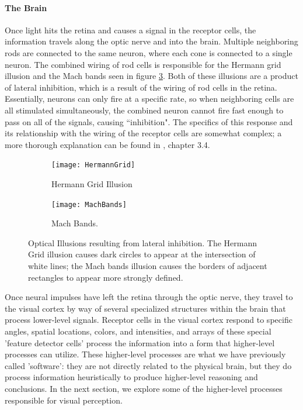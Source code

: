 \documentclass[11pt]{isuthesis}\usepackage[]{graphicx}\usepackage[]{color}
\begin{document}
\paragraph{The Brain}
Once light hits the retina and causes a signal in the receptor cells, the information travels along the optic nerve and into the brain. Multiple neighboring rods are connected to the same neuron, where each cone is connected to a single neuron. The combined wiring of rod cells is responsible for the Hermann grid illusion and the Mach bands seen in figure \ref{fig:InhibitionIllusions}. Both of these illusions are a product of lateral inhibition, which is a result of the wiring of rod cells in the retina. Essentially, neurons can only fire at a specific rate, so when neighboring cells are all stimulated simultaneously, the combined neuron cannot fire fast enough to pass on all of the signals, causing ``inhibition". The specifics of this response and its relationship with the wiring of the receptor cells are somewhat complex; a more thorough explanation can be found in \citet{goldstein}, chapter 3.4. 

\begin{figure}
\centering
\begin{subfigure}[b]{.45\textwidth}
  \centering
  \texttt{[image: HermannGrid]}
  \caption{\small Hermann Grid Illusion \label{fig:hermanngrid}}
\end{subfigure}\hfill
\begin{subfigure}[b]{.45\textwidth}
  \centering
  \texttt{[image: MachBands]}
  \caption{\small Mach Bands. 
  \label{fig:machbands}}
\end{subfigure}
\caption[Inhibition Illusions]{Optical Illusions resulting from lateral inhibition. The Hermann Grid illusion causes dark circles to appear at the intersection of white lines; the Mach bands illusion causes the borders of adjacent rectangles to appear more strongly defined.} \label{fig:InhibitionIllusions}
\end{figure}

Once neural impulses have left the retina through the optic nerve, they travel to the visual cortex by way of several specialized structures within the brain that process lower-level signals. Receptor cells in the visual cortex respond to specific angles, spatial locations, colors, and intensities, and arrays of these special 'feature detector cells' process the information into a form that higher-level processes can utilize. These higher-level processes are what we have previously called 'software': they are not directly related to the physical brain, but they do process information heuristically to produce higher-level reasoning and conclusions. In the next section, we explore some of the higher-level processes responsible for visual perception.
\end{document}
